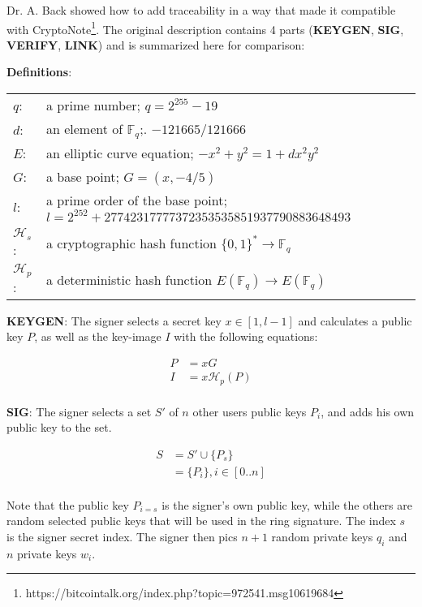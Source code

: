 Dr. A. Back showed how to add traceability in a way that made it compatible with CryptoNote\footnote{https://bitcointalk.org/index.php?topic=972541.msg10619684}. 
The original description contains 4 parts (\textbf{KEYGEN}, \textbf{SIG}, 
\textbf{VERIFY}, \textbf{LINK}) and is summarized here for comparison:


\hfill \break\textbf{Definitions}:
 
\begin{tabular}{ll}
	$q$:   & a prime number; $q = 2^{255} - 19$\\
	$d$:   & an element of $\mathbb{F}_q$;. $-121665/121666$ \\
	$E$:   & an elliptic curve equation; $-x^2 + y^2 = 1 + dx^2y^2$ \\
	$G$:   & a base point; $G=(x, -4/5)$ \\
	$l$:   & a prime order of the base point; $l=2^{252}+27742317777372353535851937790883648493$ \\
	$\mathcal{H}_s$:   & a cryptographic hash function $\{0,1\}^* \rightarrow \mathbb{F}_q$ \\
	$\mathcal{H}_p$:   & a deterministic hash function $E(\mathbb{F}_q) \rightarrow E(\mathbb{F}_q)$ \\	
\end{tabular}

\hfill \break


\hfill \break\textbf{KEYGEN}: 
The signer selects a secret key $x \in [1, l-1]$ and calculates a public 
key $P$, as well as the key-image $I$ with the following equations:

\begin{equation}
\begin{split}
P &= xG\\
I &= x\mathcal{H}_p(P)\\ 
\end{split}
\end{equation}

\textbf{SIG}: 
The signer selects a set $S'$ of $n$ other users public keys $P_i$, and 
adds his own public key to the set. 

\begin{equation}
\begin{split}
S &= S' \cup \{P_s\}\\
 &= \{P_i\}, i \in [0..n] \\
\end{split}
\end{equation}

Note that the public key $P_{i=s}$ is the signer's own public key, while 
the others are random selected public keys that will be used in the ring 
signature. The index $s$ is the signer secret index. The signer then pics 
$n+1$ random private keys $q_i$ and $n$ private keys $w_i$.

